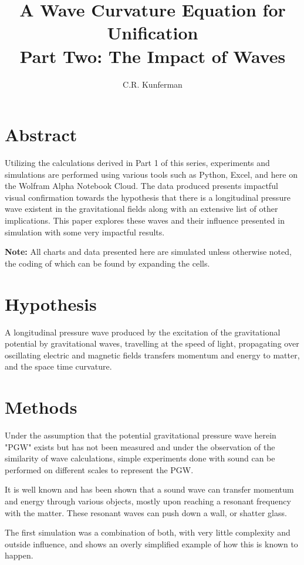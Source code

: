 \documentclass[12pt]{article}
\title{A Wave Curvature Equation for Unification \\ Part Two: The Impact of Waves}
\author{C.R. Kunferman}
\date{}
\begin{document}
\maketitle

\section*{Abstract}

Utilizing the calculations derived in Part 1 of this series, experiments and simulations are performed using various tools such as Python, Excel, and here on the Wolfram Alpha Notebook Cloud. The data produced presents impactful visual confirmation towards the hypothesis that there is a longitudinal pressure wave existent in the gravitational fields along with an extensive list of other implications. This paper explores these waves and their influence presented in simulation with some very impactful results.

\textbf{Note:} All charts and data presented here are simulated unless otherwise noted, the coding of which can be found by expanding the cells.

\section*{Hypothesis}

A longitudinal pressure wave produced by the excitation of the gravitational potential by gravitational waves, travelling at the speed of light, propagating over oscillating electric and magnetic fields transfers momentum and energy to matter, and the space time curvature.

\section*{Methods}

Under the assumption that the potential gravitational pressure wave herein "PGW" exists but has not been measured and under the observation of the similarity of wave calculations, simple experiments done with sound can be performed on different scales to represent the PGW.

It is well known and has been shown that a sound wave can transfer momentum and energy through various objects, mostly upon reaching a resonant frequency with the matter. These resonant waves can push down a wall, or shatter glass.

The first simulation was a combination of both, with very little complexity and outside influence, and shows an overly simplified example of how this is known to happen.
\end{document}
